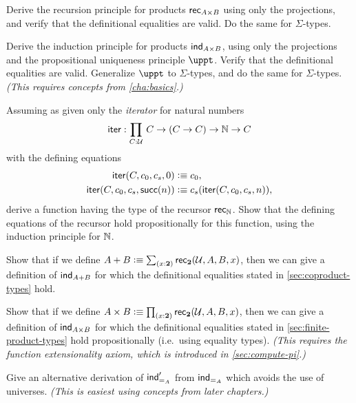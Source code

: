 \begin{ex}\label{ex:pr-to-rec}
  Derive the recursion principle for products $\mathsf{rec}_{A\times B} $ using only the projections, and verify that the definitional equalities are valid.
  Do the same for $\Sigma$-types.
\end{ex}

\begin{ex}\label{ex:pr-to-ind}
  Derive the induction principle for products $\mathsf{ind}_{A\times B}$, using only the projections and the propositional uniqueness principle $\uppt$.
  Verify that the definitional equalities are valid.
  Generalize $\uppt$ to $\Sigma$-types, and do the same for $\Sigma$-types.
  \emph{(This requires concepts from \cref{cha:basics}.)}
\end{ex}

\begin{ex}\label{ex:iterator}
Assuming as given only the \emph{iterator} for natural numbers
\[\ite : \prd{C:\UU} C \to (C \to C) \to \nat \to C \]
with the defining equations
\begin{align*}
\mathsf{iter}(C,c_0,c_s,0)  &\vcentcolon\equiv c_0, \\
\mathsf{iter}(C,c_0,c_s,\mathsf{succ}(n)) &\vcentcolon\equiv c_s(\mathsf{iter}(C,c_0,c_s,n)),
\end{align*}
derive a function having the type of the recursor $\mathsf{rec}_{\mathbb{N}}$.
Show that the defining equations of the recursor hold propositionally for this function, using the induction principle for $\mathbb{N}$.
\end{ex}

\begin{ex}\label{ex:sum-via-bool}
%
Show that if we define $A + B \defeq \sm{x:\bool} \rec{\bool}(\UU,A,B,x)$, then we can give a definition of $\mathsf{ind}_{A+B}$ for which the definitional equalities stated in \cref{sec:coproduct-types} hold.
\end{ex}

\begin{ex}\label{ex:prod-via-bool}
%
Show that if we define $A \times B \defeq \prd{x:\bool}\rec{\bool}(\UU,A,B,x)$, then we can give a definition of  $\mathsf{ind}_{A\times B}$ for which the definitional equalities stated in \cref{sec:finite-product-types} hold propositionally (i.e.\ using equality types).
\emph{(This requires the function extensionality axiom, which is introduced in \cref{sec:compute-pi}.)}
\end{ex}

\begin{ex}\label{ex:pm-to-ml}
Give an alternative derivation of $\mathsf{ind}_{=_{A}}'$ from $\mathsf{ind}_{=_{A}}$ which avoids the use of universes.
  \emph{(This is easiest using concepts from later chapters.)}
\end{ex}

